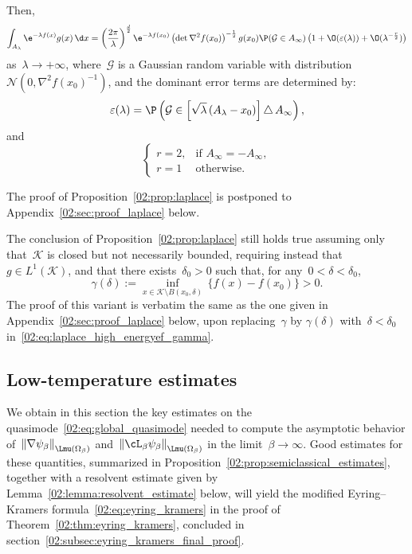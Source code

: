 \begin{proposition}
            Then, 
            \begin{equation}
                \label{02:eq:laplace_asymptotics}
                \int_{A_\lambda} \e^{-\lambda f(x)}g(x)\,\d x = \left(\frac{2\pi}{\lambda}\right)^{\frac d2}\e^{-\lambda f(x_0)}\left(\det \nabla^2 f(x_0)\right)^{-\frac12}g(x_0)\P(\mathcal G \in A_\infty)\left(1+\O(\varepsilon(\lambda)) + \O(\lambda^{-\frac r2})\right)
            \end{equation}
            as~$\lambda\to +\infty$, where~$\mathcal G$ is a Gaussian random variable with distribution~$\mathcal N\left(0,\nabla^2 f(x_0)^{-1}\right)$, and the dominant error terms are determined by:
            $$\varepsilon(\lambda) = \P\left(\mathcal G \in \left[\sqrt\lambda\left(A_\lambda-x_0\right)\right] \triangle\, A_\infty\right),$$
            and
            \[\begin{cases}
                r = 2,& \text{if } A_\infty = -A_\infty,\\
                r =1 & \text{otherwise}.
            \end{cases}
            \]
        \end{proposition}
        The proof of Proposition~\ref{02:prop:laplace} is postponed to Appendix~\ref{02:sec:proof_laplace} below.

        \begin{remark}
            The conclusion of Proposition~\ref{02:prop:laplace} still holds true assuming only that~$\mathcal K$ is closed but not necessarily bounded, requiring instead that~$g\in L^1(\mathcal K)$, and that there exists~$\delta_0>0$ such that, for any~$0<\delta<\delta_0$,
            \begin{equation}
                \gamma(\delta) := \underset{x\in \mathcal K \setminus B(x_0,\delta)}{\inf}\, \{f(x)-f(x_0)\}>0.
            \end{equation}
            The proof of this variant is verbatim the same as the one given in Appendix~\ref{02:sec:proof_laplace} below, upon replacing~$\gamma$ by $\gamma(\delta)$ with~$\delta<\delta_0$ in~\eqref{02:eq:laplace_high_energyef_gamma}.
        \end{remark}

        \subsection{Low-temperature estimates}
        \label{02:subsec:semiclassical_estimates}
        We obtain in this section the key estimates on the quasimode~\eqref{02:eq:global_quasimode} needed to compute the asymptotic behavior of~$\left\|\nabla \psi_\beta\right\|_{\Lmu(\Omega_\beta)}$ and~$\left\|\cL_\beta\psi_\beta\right\|_{\Lmu(\Omega_\beta)}$ in the limit~$\beta\to\infty$.
        Good estimates for these quantities, summarized in Proposition~\ref{02:prop:semiclassical_estimates}, together with a resolvent estimate given by Lemma~\ref{02:lemma:resolvent_estimate} below, will yield the modified Eyring--Kramers formula~\eqref{02:eq:eyring_kramers} in the proof of Theorem~\ref{02:thm:eyring_kramers}, concluded in section~\ref{02:subsec:eyring_kramers_final_proof}.

